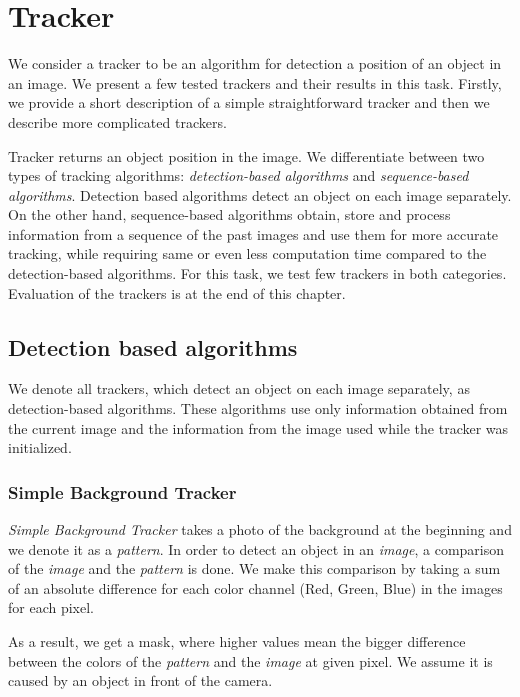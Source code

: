 \chapter{Tracker}

We consider a tracker to be an algorithm for detection a position of an object in
an image. We present a few tested trackers and their results in this task.
Firstly, we provide a short description of a simple straightforward tracker and
then we describe more complicated trackers.

Tracker returns an object position in the image. We differentiate between two
types of tracking algorithms: \emph{detection-based algorithms} and
\emph{sequence-based algorithms}. Detection based algorithms detect an object
on each image separately. On the other hand, sequence-based algorithms obtain,
store and process information from a sequence of the past images and use them
for more accurate tracking, while requiring same or even less computation time
compared to the detection-based algorithms. For this task, we test few trackers
in both categories. Evaluation of the trackers is at the end of this chapter.


\section {Detection based algorithms}

We denote all trackers, which detect an object on each image separately, as
detection-based algorithms. These algorithms use only information obtained from
the current image and the information from the image used while the tracker was
initialized.

\subsection{Simple Background Tracker}

\emph{Simple Background Tracker} takes a photo of the background at the
beginning and we denote it as a \emph{pattern}. In order to detect an object in
an \emph{image}, a comparison of the \emph{image} and the \emph{pattern} is done.
We make this comparison by taking a sum of an absolute difference for each
color channel (Red, Green, Blue) in the images for each pixel.

As a result, we get a mask, where higher values mean the bigger difference between
the colors of the \emph{pattern} and the \emph{image} at given pixel. We assume it
is caused by an object in front of the camera.

